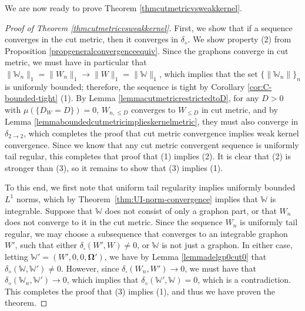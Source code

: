 \documentclass{amsart}
\numberwithin{equation}{section}
\numberwithin{figure}{section}
\theoremstyle{definition}
\theoremstyle{remark}
\newcommand{\bOmega}{{\mathbf{\Omega}}}
\newcommand{\cW}{\mathbb{W}}
\newcommand{\deltt}{\delta_{2\to 2}}
\def\delGP{\delta_\diamond}
\begin{document}
We are now ready to prove Theorem \ref{thmcutmetricvsweakkernel}.

\begin{proof}[Proof of Theorem \ref{thmcutmetricvsweakkernel}]
First, we show that if a sequence converges in the cut metric, then it
converges in $\delGP$. We show property (2) from Proposition
\ref{propgeneralconvergenceequiv}. Since the graphons converge in cut metric,
we must have in particular that $\|\cW_n\|_1=\|W_n\|_1 \to
\|W\|_1=\|\cW\|_1$, which implies that the set $\{\|\cW_n\|\}_{n}$ is
uniformly bounded; therefore, the sequence is tight by Corollary
\ref{cor:C-bounded-tight} (1). By Lemma \ref{lemmacutmetricrestrictedtoD},
for any $D>0$ with $\mu(\{D_W=D\})=0$, $W_{n,\le D}$ converges to $W_{\le D}$
in cut metric, and by Lemma \ref{lemmaboundedcutmetricimplieskernelmetric},
they must also converge in $\deltt$, which completes the proof that cut
metric convergence implies weak kernel convergence. Since we know that any
cut metric convergent sequence is uniformly tail regular, this completes that
proof that (1) implies (2). It is clear that (2) is stronger than (3), so it
remains to show that (3) implies (1).

To this end, we first note that uniform tail regularity implies uniformly
bounded $L^1$ norms, which by Theorem~\ref{thm:UI-norm-convergence} implies
that $\cW$ is integrable. Suppose that $\cW$ does not consist of only a
graphon part, or that $W_n$ does not converge to it in the cut metric. Since
the sequence $W_n$ is uniformly tail regular, we may choose a subsequence
that converges to an integrable graphon $W'$, such that either
$\delta_\square(W',W) \ne 0$, or $\cW$ is not just a graphon. In either case,
letting $\cW'=(W',0,0,\bOmega')$, we have by Lemma \ref{lemmadelgp0cut0} that
$\delGP(\cW,\cW') \ne 0$. However, since $\delta_\square(W_n,W') \to 0$, we
must have that $\delGP(\cW_n,\cW') \to 0$, which implies that
$\delGP(\cW',\cW)=0$, which is a contradiction. This completes the proof that
(3) implies (1), and thus we have proven the theorem.
\end{proof}
\end{document}
